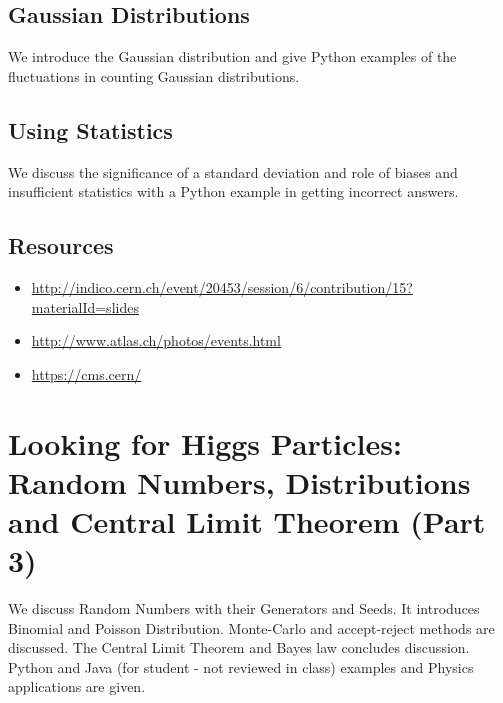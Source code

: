 \subsection{Gaussian Distributions}\label{gaussian-distributions}

We introduce the Gaussian distribution and give Python examples of the
fluctuations in counting Gaussian distributions.


\subsection{Using Statistics}\label{using-statistics}

We discuss the significance of a standard deviation and role of biases
and insufficient statistics with a Python example in getting incorrect
answers.


\subsection{Resources}\label{resources-2}

\begin{itemize}

\item
  \url{http://indico.cern.ch/event/20453/session/6/contribution/15?materialId=slides}
\item
  \url{http://www.atlas.ch/photos/events.html}
\item
  \url{https://cms.cern/}
\end{itemize}

\section{Looking for Higgs Particles: Random Numbers, Distributions
and Central Limit Theorem (Part
3)}\label{looking-for-higgs-particles-random-numbers-distributions-and-central-limit-theorem-part-3}

We discuss Random Numbers with their Generators and Seeds. It introduces
Binomial and Poisson Distribution. Monte-Carlo and accept-reject methods
are discussed. The Central Limit Theorem and Bayes law concludes
discussion. Python and Java (for student - not reviewed in class)
examples and Physics applications are given.


